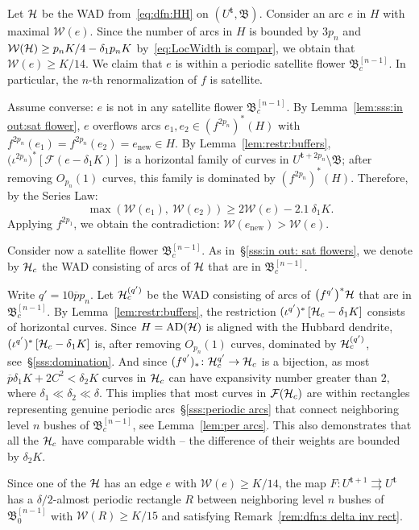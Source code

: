 \documentclass{amsart}
\newcommand{\AD}{{\operatorname{AD}}}
\newcommand{\bush}{{\mathfrak B }}
\newcommand{\bbush}{{\boldsymbol {\mathfrak B} }}
\newcommand{\1}{{\mathbb 1 }}
\newcommand{\Fam}{{\mathcal F}}
\newcommand{\Width}{{\mathcal W}}
\newcommand\new{{\operatorname{new}}}
\newcommand{\bbt}{{\mathbf t}}
\renewcommand{\max}{{\operatorname{max}}}
\begin{document}
Let ${\mathcal H}$ be the WAD from~\eqref{eq:dfn:HH} on $(U^\bbt, \bbush)$.  Consider an arc $e$ in $H$ with maximal $\Width(e)$. Since the number of arcs in $H$ is bounded by $3p_n$ and $\Width(\HH)\ge p_nK/4 - \delta_1 p_n K$ by~\eqref{eq:LocWidth is compar}, we obtain that $\Width(e)\ge K/14$. We claim that $e$ is within a periodic satellite flower $\bush^{[n-1]}_c$. In particular, the $n$-th renormalization of $f$ is satellite. 

Assume converse: $e$ is not in any satellite flower $\bush^{[n-1]}_c$. By Lemma~\ref{lem:sss:in out:sat flower}, $e$ overflows arcs $e_1,e_2\in (f^{2p_n})^*(H)$ with $f^{2p_n}(e_1)=f^{2p_n}(e_2)=e_\new\in H$. By Lemma~\ref{lem:restr:buffers}, $\big(\iota^{2p_n}\big)^*\left[\Fam(e-\delta_1K)\right]$ is a horizontal family of curves in $U^{\bbt+2p_n}\setminus \bbush$; after removing $O_{p_n}(1)$ curves, this family is dominated by $(f^{2p_n})^*(H)$. Therefore, by the Series Law:
\[\max\left(\Width(e_1), \ \Width(e_2)\right) \ge 2 \Width(e) - 2.1\ \delta_1K. \]
Applying $f^{2p_1}$, we obtain the contradiction: $\Width(e_\new)>\Width(e)$.


Consider now a  satellite flower $\bush^{[n-1]}_c$.  As in~\S\ref{sss:in out: sat flowers}, we denote by ${\mathcal H}_c$ the WAD consisting of arcs of ${\mathcal H}$ that are in $\bush^{[n-1]}_c$. 


Write $q'=10 \overline p p_n$. Let  ${\mathcal H}^{(q')}_c$ be the WAD consisting of arcs of $\big(f^{q'}\big)^*{\mathcal H}$ that are in $ \bush^{[n-1]}_c$. By Lemma~\ref{lem:restr:buffers}, the restriction $(\iota^{q'})^*\left[{\mathcal H}_c-\delta_1 K \right]$ consists of horizontal curves. Since $H=\AD(\HH)$ is aligned with the Hubbard dendrite, $(\iota^{q'})^*\left[{\mathcal H}_c-\delta_1 K \right]$ is, after removing $O_{p_n}(1)$ curves, dominated by ${\mathcal H}^{(q')}_c$, see~\S\ref{sss:domination}. And since $(f^{q'})_*\colon {\mathcal H}^{q'}_c\to {\mathcal H}_c$ is a bijection, as most $\overline p \delta_1K + 2C^2< \delta_2 K$ curves in ${\mathcal H}_c$ can have expansivity number greater than $2$, where $\delta_1\ll \delta_2\ll \delta$. This implies that most curves in $\Fam(\HH_c)$ are within rectangles representing genuine periodic arcs~\S\ref{sss:periodic arcs} that connect neighboring level $n$ bushes of $\bush^{[n-1]}_c$, see Lemma~\ref{lem:per arcs}. This also demonstrates that all the ${\mathcal H}_c$ have comparable width -- the difference of their weights are bounded by $\delta_2 K$.


Since one of the ${\mathcal H}$ has an edge $e$ with $\Width(e)\ge K/14$, 
the map $F\colon U^{\bbt+1}\rightrightarrows U^\bbt$ has a $\delta/2$-almost periodic rectangle $R$ between neighboring level $n$ bushes of $\bush^{[n-1]}_0$ with $\Width(R)\ge K/15$ and satisfying Remark~\ref{rem:dfn:s delta inv rect}.
\end{document}
